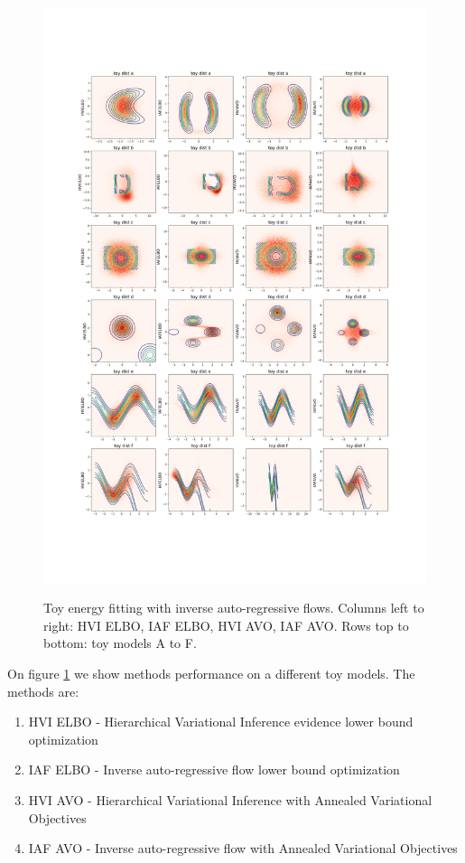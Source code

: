 \documentclass{article}
\begin{document}
\begin{figure}
    \caption{Toy energy fitting with inverse auto-regressive flows. Columns left to right: HVI ELBO, IAF ELBO, HVI AVO, IAF AVO. Rows top to bottom: toy models A to F.}
    \centering
    \includegraphics[width=\textwidth]{toy_figs}
    \label{toy_figs}
\end{figure}

On figure \ref{toy_figs} we show methods performance on a different toy models. 
The methods are: 
\begin{enumerate}
\item HVI ELBO -  Hierarchical Variational Inference evidence lower bound optimization \cite{ranganath2015hierarchical}
\item IAF ELBO -  Inverse auto-regressive flow lower bound optimization
\item HVI AVO  - Hierarchical Variational Inference with  Annealed Variational Objectives
\item IAF AVO  - Inverse auto-regressive flow with  Annealed Variational Objectives
\end{enumerate}
\end{document}

